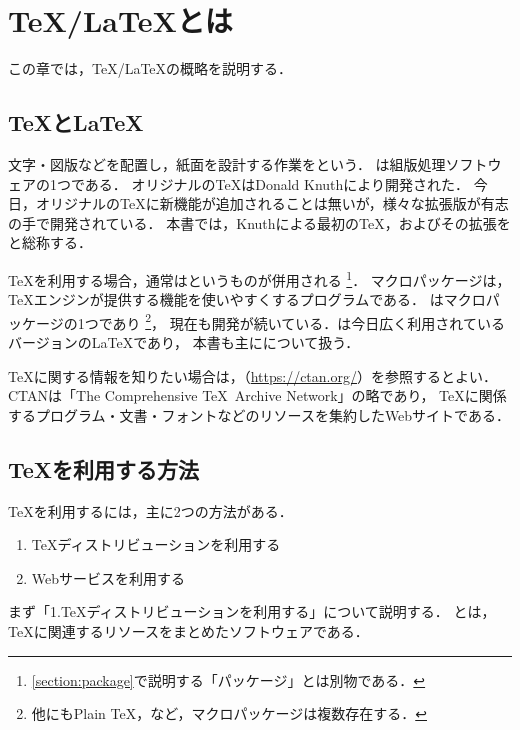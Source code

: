 \documentclass[../../index]{subfiles}
\begin{document}
\chapter{\TeX /\LaTeX とは}
この章では，\TeX /\LaTeX の概略を説明する．

\section{\TeX と\LaTeX}
文字・図版などを配置し，紙面を設計する作業をという．
\termdef{\TeX}は組版処理ソフトウェアの1つである．
オリジナルの\TeX はDonald Knuthにより開発された．
今日，オリジナルの\TeX に新機能が追加されることは無いが，様々な拡張版が有志の手で開発されている．
本書では，Knuthによる最初の\TeX ，およびその拡張を
と総称する．

\TeX を利用する場合，通常はというものが併用される
\footnote{\cref{section:package}で説明する「パッケージ」とは別物である．}．
マクロパッケージは，\TeX エンジンが提供する機能を使いやすくするプログラムである．
\termdef{\LaTeX}はマクロパッケージの1つであり
\footnote{他にもPlain \TeX，\ConTeXt など，マクロパッケージは複数存在する．}，
現在も開発が続いている．\termdef{\LaTeXe}は今日広く利用されているバージョンの\LaTeX であり，
本書も主に\LaTeXe について扱う．

\TeX に関する情報を知りたい場合は，（\url{https://ctan.org/}）を参照するとよい．
CTANは「The Comprehensive \TeX\ Archive Network」の略であり，
\TeX に関係するプログラム・文書・フォントなどのリソースを集約したWebサイトである．

\section{\TeX を利用する方法}
\TeX を利用するには，主に2つの方法がある．

\begin{enumerate}
  \item \TeX ディストリビューションを利用する
  \item Webサービスを利用する
\end{enumerate}

まず「1.\TeX ディストリビューションを利用する」について説明する．
とは，
\TeX に関連するリソースをまとめたソフトウェアである．
\end{document}
